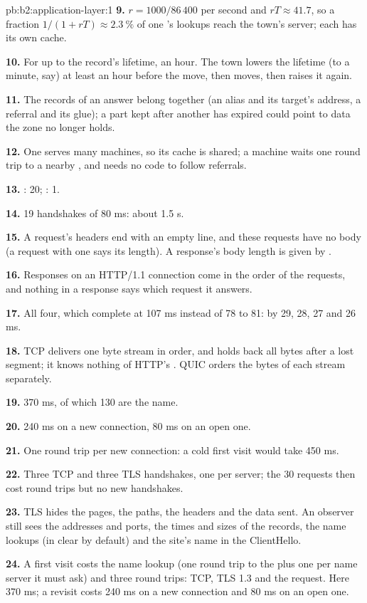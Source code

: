 \begin{solution}{pb:b2:application-layer:1}
\textbf{9.} $r = 1000/86\,400$ per second and $rT \approx 41.7$, so a fraction $1/(1 + rT) \approx 2.3~\%$ of one
's lookups reach the town's server; each  has its own cache.

\textbf{10.} For up to the record's lifetime, an hour. The town lowers the lifetime (to a minute, say) at least an
hour before the move, then moves, then raises it again.

\textbf{11.} The records of an answer belong together (an alias and its target's address, a referral and its glue); a
part kept after another has expired could point to data the zone no longer holds.

\textbf{12.} One  serves many machines, so its cache is shared; a machine waits one round trip to a nearby
, and needs no code to follow referrals.

\textbf{13.} : 20; : 1.

\textbf{14.} 19 handshakes of 80 ms: about 1.5 s.

\textbf{15.} A request's headers end with an empty line, and these requests have no body (a request with one says its
length). A response's body length is given by .

\textbf{16.} Responses on an HTTP/1.1 connection come in the order of the requests, and nothing in a response says
which request it answers.

\textbf{17.} All four, which complete at 107 ms instead of 78 to 81: by 29, 28, 27 and 26 ms.

\textbf{18.} TCP delivers one byte stream in order, and holds back all bytes after a lost segment; it knows nothing of
HTTP's . QUIC orders the bytes of each stream separately.

\textbf{19.} 370 ms, of which 130 are the name.

\textbf{20.} 240 ms on a new connection, 80 ms on an open one.

\textbf{21.} One round trip per new connection: a cold first visit would take 450 ms.

\textbf{22.} Three TCP and three TLS handshakes, one per server; the 30 requests then cost round trips but no new
handshakes.

\textbf{23.} TLS hides the pages, the paths, the headers and the data sent. An observer still sees the addresses and
ports, the times and sizes of the records, the name lookups (in clear by default) and the site's name in the
ClientHello.

\textbf{24.} A first visit costs the name lookup (one round trip to the  plus one per name server it must
ask) and three round trips: TCP, TLS 1.3 and the request. Here 370 ms; a revisit costs 240 ms on a new connection and
80 ms on an open one.
\end{solution}
